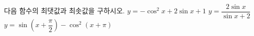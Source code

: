 다음 함수의 최댓값과 최솟값을 구하시오.
 $y=-\cos^2 x+2\sin x+1$
 $y=\dfrac{2\sin x}{\sin x+2}$
 $y=\sin\left(x+\dfrac{\pi}{2}\right)-\cos^2(x+\pi)$
